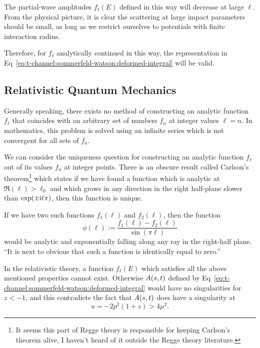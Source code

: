The partial-wave amplitudes $f_{\ell}(E)$ defined in this way will
decrease at large $\ell$. From the physical picture, it is clear the
scattering at large impact parameters should be small, as long as we
restrict ourselves to potentials with finite interaction radius.

Therefore, for $f_{\ell}$ analytically continued in this way, the
representation in Eq~\eqref{eq:t-channel:sommerfeld-watson:deformed-integral}
will be valid.

\subsection{Relativistic Quantum Mechanics}

Generally speaking, there exists no method of constructing an analytic
function $f_{\ell}$ that coincides with an arbitrary set of numbers
$f_{n}$ at integer values $\ell=n$. In mathematics, this problem is
solved using an infinite series which is not convergent for all sets of
$f_{n}$.

We can consider the uniqueness question for constructing an analytic
function $f_{\ell}$ out of its values $f_{n}$ at integer points. There
is an obscure result called Carlson's theorem\footnote{It seems this
part of Regge theory is responsible for keeping Carlson's theorem alive,
I haven't heard of it outside the Regge theory literature.} which states
if we have found a function which is analytic at $\Re(\ell)>\ell_{0}$
and which grows in any direction in the right half-plane slower than
$\exp(\pm\mathrm{i}\ell\pi)$, then this function is unique.

If we have two such functions $f_{1}(\ell)$ and $f_{2}(\ell)$, then the
function
\begin{equation}
\phi(\ell) :=\frac{f_{1}(\ell)-f_{2}(\ell)}{\sin(\pi\ell)}
\end{equation}
would be analytic and exponentially falling along any ray in the
right-half plane. ``It is next to obvious that such a function is
identically equal to zero.''

\M
In the relativistic theory, a function $f_{\ell}(E)$ which satisfies all
the above mentioned properties cannot exist. Otherwise $A(s,t)$
defined by Eq~\eqref{eq:t-channel:sommerfeld-watson:deformed-integral}
would have no singularities for $z<-1$, and this contradicts the fact
that $A(s,t)$ does have a singularity at
\begin{equation}
u = -2p^{2}(1+z) > 4\mu^{2}.
\end{equation}

